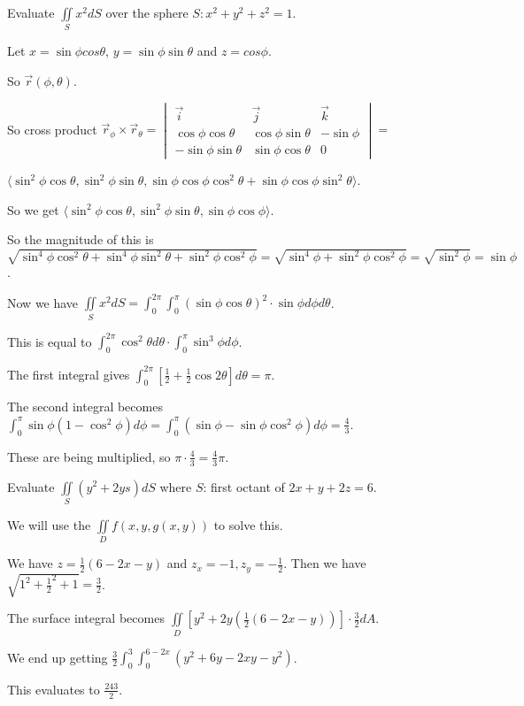 \documentclass[../calc3.tex]{subfiles}
\begin{document}
\begin{example}
    Evaluate $\iint\limits_{S}x^2 dS$ over the sphere $S: x^2+y^2+z^2=1$.

    Let $x=\sin\phi cos\theta$, $y=\sin\phi\sin\theta$ and $z=cos\phi$.

    So $\vec{r}(\phi,\theta)$.

    So cross product $\vec{r}_\phi \times \vec{r}_\theta = \begin{vmatrix}
        \vec{i}&\vec{j}&\vec{k}\\
        \cos\phi\cos\theta & \cos\phi\sin\theta & -\sin\phi \\
        -\sin\phi\sin\theta & \sin\phi\cos\theta & 0
    \end{vmatrix} = $
    
    $\langle \sin^2\phi\cos\theta,\sin^2\phi\sin\theta, \sin\phi\cos\phi\cos^2\theta + \sin\phi\cos\phi\sin^2\theta\rangle$.

    So we get $\langle \sin^2\phi\cos\theta, \sin^2\phi\sin\theta, \sin\phi\cos\phi\rangle$.

    So the magnitude of this is $\sqrt{\sin^4\phi\cos^2\theta+\sin^4\phi\sin^2\theta+\sin^2\phi\cos^2\phi}=\sqrt{\sin^4\phi+\sin^2\phi\cos^2\phi}=\sqrt{\sin^2\phi}=\sin\phi$.

    Now we have $\iint\limits_{S}x^2 dS = \int_0^{2\pi}\int_0^{\pi}(\sin\phi\cos\theta)^2\cdot \sin\phi d\phi d\theta$.

    This is equal to $\int_0^{2\pi}\cos^2\theta d\theta \cdot \int_0^{\pi}\sin^3\phi d\phi$.

    The first integral gives $\int_0^{2\pi}\left[\frac{1}{2}+\frac{1}{2}\cos 2\theta\right]d\theta = \pi$.

    The second integral becomes $\int_0^{\pi}\sin\phi(1-\cos^2\phi)d\phi = \int_0^{\pi}(\sin\phi-\sin\phi\cos^2\phi)d\phi = \frac{4}{3}$.

    These are being multiplied, so $\pi\cdot \frac{4}{3}=\frac{4}{3}\pi$.
\end{example}
\pagebreak
\begin{example}
    Evaluate $\iint\limits_{S}(y^2+2ys)dS$ where $S$: first octant of $2x+y+2z=6$.

    We will use the $\iint\limits_{D}f(x,y,g(x,y))$ to solve this.

    We have $z=\frac{1}{2}(6-2x-y)$ and $z_x=-1, z_y=-\frac{1}{2}$. Then we have $\sqrt{1^2+\frac{1}{2}^2+1}=\frac{3}{2}$.

    The surface integral becomes $\iint\limits_{D} [y^2+2y(\frac{1}{2}(6-2x-y))]\cdot \frac{3}{2}dA$.

    We end up getting $\frac{3}{2}\int_0^3 \int_0^{6-2x} (y^2+6y-2xy-y^2)$.

    This evaluates to $\frac{243}{2}$.
\end{example}
\end{document}
